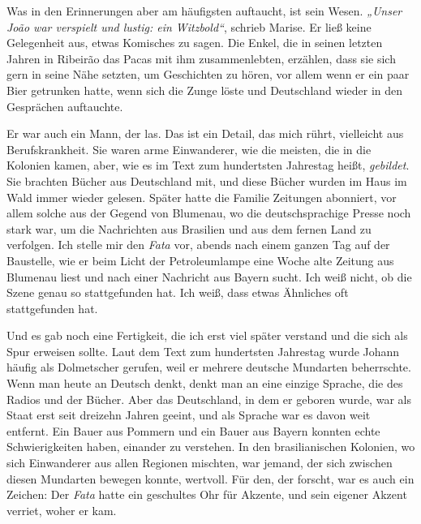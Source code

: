 \documentclass[
  ngerman,
  11pt,
  openany]{book}
\begin{document}
Was in den Erinnerungen aber am häufigsten auftaucht, ist sein Wesen.
\emph{„Unser João war verspielt und lustig: ein Witzbold``}, schrieb
Marise. Er ließ keine Gelegenheit aus, etwas Komisches zu sagen. Die
Enkel, die in seinen letzten Jahren in Ribeirão das Pacas mit ihm
zusammenlebten, erzählen, dass sie sich gern in seine Nähe setzten, um
Geschichten zu hören, vor allem wenn er ein paar Bier getrunken hatte,
wenn sich die Zunge löste und Deutschland wieder in den Gesprächen
auftauchte.

Er war auch ein Mann, der las. Das ist ein Detail, das mich rührt,
vielleicht aus Berufskrankheit. Sie waren arme Einwanderer, wie die
meisten, die in die Kolonien kamen, aber, wie es im Text zum hundertsten
Jahrestag heißt, \emph{gebildet}. Sie brachten Bücher aus Deutschland
mit, und diese Bücher wurden im Haus im Wald immer wieder gelesen.
Später hatte die Familie Zeitungen abonniert, vor allem solche aus der
Gegend von Blumenau, wo die deutschsprachige Presse noch stark war, um
die Nachrichten aus Brasilien und aus dem fernen Land zu verfolgen. Ich
stelle mir den \emph{Fata} vor, abends nach einem ganzen Tag auf der
Baustelle, wie er beim Licht der Petroleumlampe eine Woche alte Zeitung
aus Blumenau liest und nach einer Nachricht aus Bayern sucht. Ich weiß
nicht, ob die Szene genau so stattgefunden hat. Ich weiß, dass etwas
Ähnliches oft stattgefunden hat.

Und es gab noch eine Fertigkeit, die ich erst viel später verstand und
die sich als Spur erweisen sollte. Laut dem Text zum hundertsten
Jahrestag wurde Johann häufig als Dolmetscher gerufen, weil er mehrere
deutsche Mundarten beherrschte. Wenn man heute an Deutsch denkt, denkt
man an eine einzige Sprache, die des Radios und der Bücher. Aber das
Deutschland, in dem er geboren wurde, war als Staat erst seit dreizehn
Jahren geeint, und als Sprache war es davon weit entfernt. Ein Bauer aus
Pommern und ein Bauer aus Bayern konnten echte Schwierigkeiten haben,
einander zu verstehen. In den brasilianischen Kolonien, wo sich
Einwanderer aus allen Regionen mischten, war jemand, der sich zwischen
diesen Mundarten bewegen konnte, wertvoll. Für den, der forscht, war es
auch ein Zeichen: Der \emph{Fata} hatte ein geschultes Ohr für Akzente,
und sein eigener Akzent verriet, woher er kam.
\end{document}
